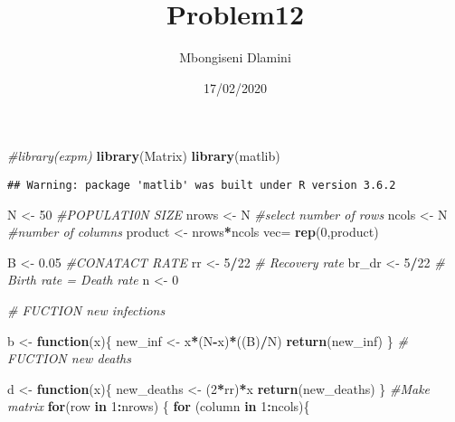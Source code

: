 \documentclass[]{article}
\title{Problem12}
\author{Mbongiseni Dlamini}
\date{17/02/2020}
\newenvironment{Shaded}{\begin{snugshade}}{\end{snugshade}}
\newcommand{\CommentTok}[1]{\textcolor[rgb]{0.56,0.35,0.01}{\textit{#1}}}
\newcommand{\ControlFlowTok}[1]{\textcolor[rgb]{0.13,0.29,0.53}{\textbf{#1}}}
\newcommand{\DecValTok}[1]{\textcolor[rgb]{0.00,0.00,0.81}{#1}}
\newcommand{\FloatTok}[1]{\textcolor[rgb]{0.00,0.00,0.81}{#1}}
\newcommand{\KeywordTok}[1]{\textcolor[rgb]{0.13,0.29,0.53}{\textbf{#1}}}
\newcommand{\NormalTok}[1]{#1}
\newcommand{\OperatorTok}[1]{\textcolor[rgb]{0.81,0.36,0.00}{\textbf{#1}}}
\newcommand{\StringTok}[1]{\textcolor[rgb]{0.31,0.60,0.02}{#1}}
\begin{document}
\maketitle

\begin{Shaded}
\begin{Highlighting}[]
\CommentTok{#library(expm)}
\KeywordTok{library}\NormalTok{(Matrix)}
\KeywordTok{library}\NormalTok{(matlib)}
\end{Highlighting}
\end{Shaded}

\begin{verbatim}
## Warning: package 'matlib' was built under R version 3.6.2
\end{verbatim}

\begin{Shaded}
\begin{Highlighting}[]
\NormalTok{N <-}\StringTok{ }\DecValTok{50} \CommentTok{#POPULATI0N SIZE}
\NormalTok{nrows <-}\StringTok{ }\NormalTok{N }\CommentTok{#select number of rows}
\NormalTok{ncols <-}\StringTok{ }\NormalTok{N }\CommentTok{#number of columns}
\NormalTok{product <-}\StringTok{ }\NormalTok{nrows}\OperatorTok{*}\NormalTok{ncols}
\NormalTok{vec=}\StringTok{ }\KeywordTok{rep}\NormalTok{(}\DecValTok{0}\NormalTok{,product)}


\NormalTok{B <-}\StringTok{ }\FloatTok{0.05} \CommentTok{#CONATACT RATE}
\NormalTok{rr <-}\StringTok{ }\DecValTok{5}\OperatorTok{/}\DecValTok{22} \CommentTok{# Recovery rate}
\NormalTok{br_dr <-}\StringTok{ }\DecValTok{5}\OperatorTok{/}\DecValTok{22} \CommentTok{# Birth rate = Death rate}
\NormalTok{n <-}\StringTok{ }\DecValTok{0}

\CommentTok{# FUCTION new infections}

\NormalTok{b <-}\StringTok{ }\ControlFlowTok{function}\NormalTok{(x)\{}
\NormalTok{  new_inf <-}\StringTok{ }\NormalTok{x}\OperatorTok{*}\NormalTok{(N}\OperatorTok{-}\NormalTok{x)}\OperatorTok{*}\NormalTok{((B)}\OperatorTok{/}\NormalTok{N)}
  \KeywordTok{return}\NormalTok{(new_inf)}
\NormalTok{\}}
\CommentTok{# FUCTION new deaths}

\NormalTok{d <-}\StringTok{ }\ControlFlowTok{function}\NormalTok{(x)\{}
\NormalTok{  new_deaths <-}\StringTok{ }\NormalTok{(}\DecValTok{2}\OperatorTok{*}\NormalTok{rr)}\OperatorTok{*}\NormalTok{x}
  \KeywordTok{return}\NormalTok{(new_deaths)}
\NormalTok{\}}
\CommentTok{#Make matrix}
\ControlFlowTok{for}\NormalTok{(row }\ControlFlowTok{in} \DecValTok{1}\OperatorTok{:}\NormalTok{nrows)}
\NormalTok{\{}
  \ControlFlowTok{for}\NormalTok{ (column }\ControlFlowTok{in} \DecValTok{1}\OperatorTok{:}\NormalTok{ncols)\{}
    

\end{Highlighting}
\end{Shaded}
\end{document}
